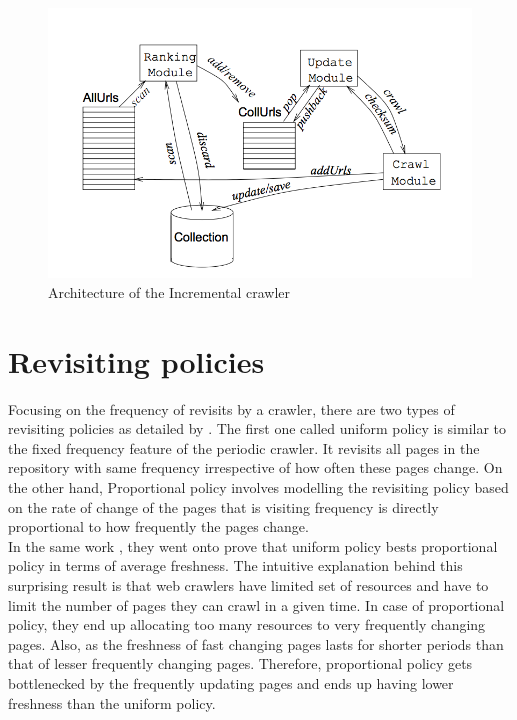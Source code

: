 \documentclass[a4paper, 11pt]{article} %
\begin{document}
\begin{figure}[h] %
\begin{center}
\includegraphics[width=1\textwidth]{incremental.png}
\end{center}
\caption{Architecture of the Incremental crawler}
\end{figure}

\section{Revisiting policies}

Focusing on the frequency of revisits by a crawler, there are two types of revisiting policies as detailed by \cite{cho2003effective}. The first one called uniform policy is similar to the fixed frequency feature of the periodic crawler. It revisits all pages in the repository with same frequency irrespective of how often these pages change. On the other hand, Proportional policy involves modelling the revisiting policy based on the rate of change of the pages that is visiting frequency is directly proportional to how frequently the pages change. \\

In the same work \cite{cho2003estimating}, they went onto prove that uniform policy bests proportional policy in terms of average freshness. The intuitive explanation behind this surprising result is that web crawlers have limited set of resources and have to limit the number of pages they can crawl in a given time. In case of proportional policy, they end up allocating too many resources to very frequently changing pages. Also, as the freshness of fast changing pages lasts for shorter periods than that of lesser frequently changing pages. Therefore, proportional policy gets bottlenecked by the frequently updating pages and ends up having lower freshness than the uniform policy.
\end{document}
